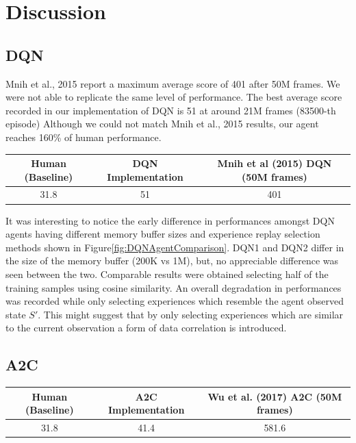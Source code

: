 \documentclass{article}
\begin{document}
\section{Discussion}
    

\subsection{DQN}
Mnih et al., 2015 report a maximum average score of 401 after 50M frames. We were not able to replicate the same level of performance. The best average score recorded in our implementation of DQN is 51 at around 21M frames (83500-th episode) Although we could not match Mnih et al., 2015 results, our agent reaches 160\% of human performance.
\begin{table}[H]
\centering
\begin{tabular}{|c | c | c |} 
 \hline
 Human (Baseline) & DQN Implementation & Mnih et al (2015) DQN (50M frames) \\ [0.5ex] 
 \hline
 31.8 & 51 & 401  \\ 
 \hline
\end{tabular}
\end{table}
It was interesting to notice the early difference in performances amongst DQN agents having different memory buffer sizes and experience replay selection methods shown in Figure\ref{fig:DQNAgentComparison}. DQN1 and DQN2 differ in the size of the memory buffer (200K vs 1M), but, no appreciable difference was seen between the two. Comparable results were obtained selecting half of the training samples using cosine similarity. An overall degradation in performances was recorded while only selecting experiences which resemble the agent observed state $S'$. This might suggest that by only selecting experiences which are similar to the current observation a form of data correlation is introduced.

\subsection{A2C}

\begin{table}[H]
\centering
\begin{tabular}{|c | c | c |} 
 \hline
 Human (Baseline) & A2C Implementation & Wu et al. (2017) A2C (50M frames) \\ [0.5ex]
 \hline
 31.8 & 41.4 & 581.6  \\ 
 \hline
\end{tabular}
\end{table}
\end{document}
